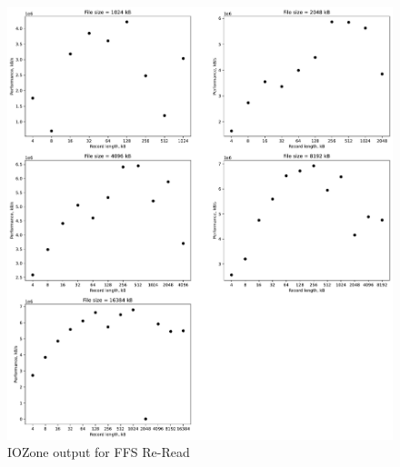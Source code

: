 \begin{figure}[!htb]
	\label{fig:app_bench_ffs_rnd_read}
	\begin{center}
		\includegraphics[width=1.0\textwidth]{figures/benchmarking/ffs/Re-Reader.pdf}
	\end{center}
	\caption{IOZone output for FFS Re-Read}
\end{figure}

